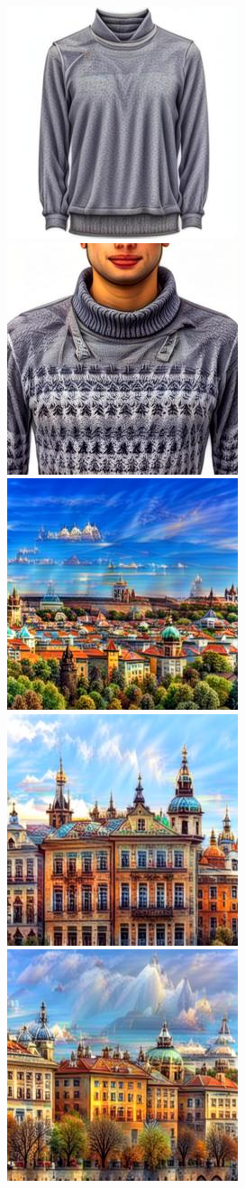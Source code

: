\begin{figure}[h!]
\begin{subfigure}[t]{0.32\linewidth}
	\includegraphics[width=0.320\linewidth]{figs/samples_appendix_3/draft1k_cfg_2_ode_prompt_28_image_2.jpg}\;%
	\includegraphics[width=0.320\linewidth]{figs/samples_appendix_3/draft1k_cfg_2_ode_prompt_28_image_3.jpg}\\ 
	\includegraphics[width=0.320\linewidth]{figs/samples_appendix_3/draft1k_cfg_2_ode_prompt_34_image_1.jpg}\;%
	\includegraphics[width=0.320\linewidth]{figs/samples_appendix_3/draft1k_cfg_2_ode_prompt_34_image_2.jpg}\;%
	\includegraphics[width=0.320\linewidth]{figs/samples_appendix_3/draft1k_cfg_2_ode_prompt_34_image_3.jpg}\\ 

\end{subfigure}
\end{figure}
